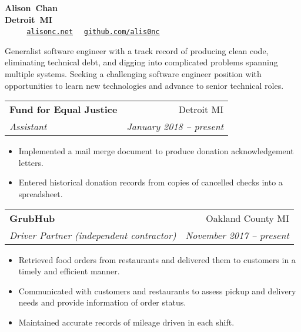 \documentclass[letterpaper,10pt]{article}
\makeatletter
\newlength{\listsep}
\newcommand{\resitem}[1]{\item #1 \vspace{-2pt}}
\newcommand{\resheading}[1]{\vspace{4pt}
  \parbox{\textwidth}{
      \framebox[\textwidth][l]{
          {\textbf{\sffamily{\large #1}}}
      }
  }
}
\newcommand{\ressubheading}[4]{
\begin{tabular*}{\textwidth}{l@{\cftdotfill{\cftsecdotsep}\extracolsep{\fill}}r}
        \textbf{#1} & #2 \\
        \textit{#3} & \textit{#4} \\
\end{tabular*}\vspace{-6pt}}
\makeatother
\begin{document}
\ifdef{\MONSTER}{\def\PUBLIC{}}{}
\ifdef{\DICE}{\def\PUBLIC{}}{}

\parbox{\textwidth}{\centering
    \textbf{{\Large Alison~Chan}} \\
    \textbf{Detroit~MI} \\
    ~\textbullet~%
    ~\textbullet~%
    \href{https://alisonc.net/}{\nolinkurl{alisonc.net}}~\textbullet~%
    \href{https://github.com/alis0nc}{\nolinkurl{github.com/alis0nc}}
}
\vspace{6pt}

{\large
Generalist software engineer with a track record of producing clean code, eliminating technical debt,
and digging into complicated problems spanning multiple systems. 
Seeking a challenging software engineer position with opportunities to learn new technologies and advance to senior technical roles.
}

\resheading{Professional Experience}


\ressubheading{Fund for Equal Justice}{Detroit MI}{Assistant}{January 2018 -- present}
\begin{itemize}\itemsep \listsep \small
	\resitem{Implemented a mail merge document to produce donation acknowledgement letters.}
	\resitem{Entered historical donation records from copies of cancelled checks into a spreadsheet.}
\end{itemize}

\ressubheading{GrubHub}{Oakland County MI}{Driver Partner {\small (independent contractor)}}{November 2017 -- present}
\begin{itemize}\itemsep \listsep  \small
	\resitem{Retrieved food orders from restaurants and delivered them to customers in a timely and efficient manner.}
	\resitem{Communicated with customers and restaurants to assess pickup and delivery needs and provide information of order status.}
	\resitem{Maintained accurate records of mileage driven in each shift.}
\end{itemize}
\end{document}
